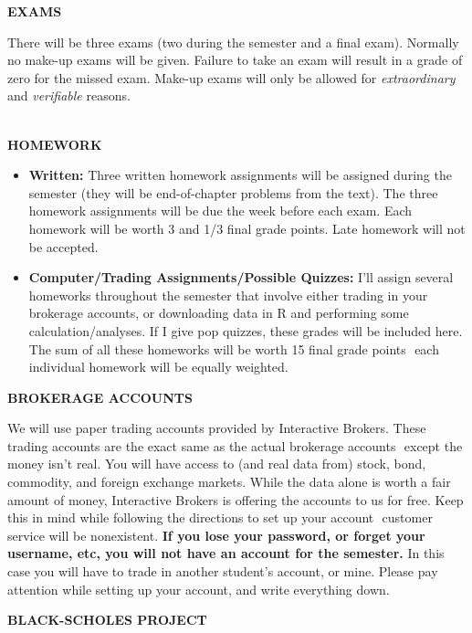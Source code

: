 \documentclass{article}
\begin{document}
\vspace*{7pt}
\begin{center}
{\bf EXAMS} 
\end{center}
There will be three exams (two during the semester and a final exam). Normally no make-up exams will be given.  Failure to take an exam will result in a grade of zero for the missed exam.  Make-up exams will only be allowed for {\it extraordinary} and {\it verifiable} reasons.\\
\\
\begin{center}
{\bf HOMEWORK} 
\end{center}
\begin{itemize}
\item {\bf Written:} Three written homework assignments will be assigned during the semester (they will be
end-of-chapter problems from the text). The three homework assignments will be due the week before
each exam. Each homework will be worth 3 and 1/3 final grade points. Late homework will not be
accepted.
%
\item {\bf Computer/Trading Assignments/Possible Quizzes:} I'll assign several homeworks throughout the
semester that involve either trading in your brokerage accounts, or downloading data in R and
performing some calculation/analyses. If I give pop quizzes, these grades will be included here. The
sum of all these homeworks will be worth 15 final grade points ­ each individual homework will be
equally weighted.
\end{itemize}
\vspace*{5pt}
\begin{center}
{\bf BROKERAGE ACCOUNTS} 
\end{center}
We will use paper trading accounts provided by Interactive Brokers. These
trading accounts are the exact same as the actual brokerage accounts ­ except the money isn’t real.
You will have access to (and real data from) stock, bond, commodity, and foreign exchange markets.
While the data alone is worth a fair amount of money, Interactive Brokers is offering the accounts to us
for free. Keep this in mind while following the directions to set up your account ­ customer service will
be nonexistent. {\bf If you lose your password, or forget your username, etc, you will not have an
account for the semester.} In this case you will have to trade in another student’s account, or mine.
Please pay attention while setting up your account, and write everything down.
\vspace*{5pt}
\begin{center}
{\bf BLACK-SCHOLES PROJECT}
\end{center}
\end{document}
